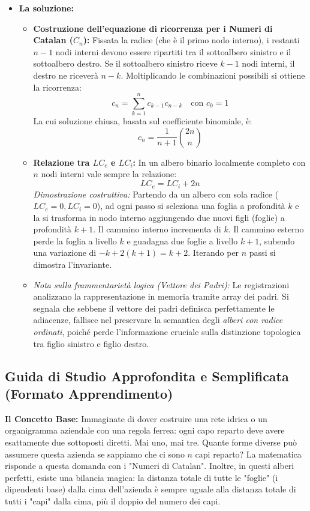 \documentclass[a4paper, 11pt]{report}
\begin{document}
\begin{itemize}
\item \textbf{La soluzione:}
\begin{itemize}
    \item \textbf{Costruzione dell'equazione di ricorrenza per i Numeri di Catalan ($C_n$):}
    Fissata la radice (che è il primo nodo interno), i restanti $n-1$ nodi interni devono essere ripartiti tra il sottoalbero sinistro e il sottoalbero destro. Se il sottoalbero sinistro riceve $k-1$ nodi interni, il destro ne riceverà $n-k$. Moltiplicando le combinazioni possibili si ottiene la ricorrenza:
    \[ c_n = \sum_{k=1}^{n} c_{k-1} c_{n-k} \quad \text{con } c_0 = 1 \]
    La cui soluzione chiusa, basata sul coefficiente binomiale, è:
    \begin{equation*}
    c_n = \frac{1}{n+1} \binom{2n}{n}
    \end{equation*}
    \item \textbf{Relazione tra $LC_e$ e $LC_i$:}
    In un albero binario localmente completo con $n$ nodi interni vale sempre la relazione:
    \[ LC_e = LC_i + 2n \]
    \textit{Dimostrazione costruttiva:} Partendo da un albero con sola radice ($LC_e=0, LC_i=0$), ad ogni passo si seleziona una foglia a profondità $k$ e la si trasforma in nodo interno aggiungendo due nuovi figli (foglie) a profondità $k+1$. Il cammino interno incrementa di $k$. Il cammino esterno perde la foglia a livello $k$ e guadagna due foglie a livello $k+1$, subendo una variazione di $-k + 2(k+1) = k + 2$. Iterando per $n$ passi si dimostra l'invariante.
    \item \textit{Nota sulla frammentarietà logica (Vettore dei Padri):} Le registrazioni analizzano la rappresentazione in memoria tramite array dei padri. Si segnala che sebbene il vettore dei padri definisca perfettamente le adiacenze, fallisce nel preservare la semantica degli \textit{alberi con radice ordinati}, poiché perde l'informazione cruciale sulla distinzione topologica tra figlio sinistro e figlio destro.
\end{itemize}
\end{itemize}

\vspace{0.5cm}
\subsection*{Guida di Studio Approfondita e Semplificata (Formato Apprendimento)}

\textbf{Il Concetto Base:}
Immaginate di dover costruire una rete idrica o un organigramma aziendale con una regola ferrea: ogni capo reparto deve avere esattamente due sottoposti diretti. Mai uno, mai tre. Quante forme diverse può assumere questa azienda se sappiamo che ci sono $n$ capi reparto? La matematica risponde a questa domanda con i "Numeri di Catalan". Inoltre, in questi alberi perfetti, esiste una bilancia magica: la distanza totale di tutte le "foglie" (i dipendenti base) dalla cima dell'azienda è sempre uguale alla distanza totale di tutti i "capi" dalla cima, più il doppio del numero dei capi.
\end{document}
